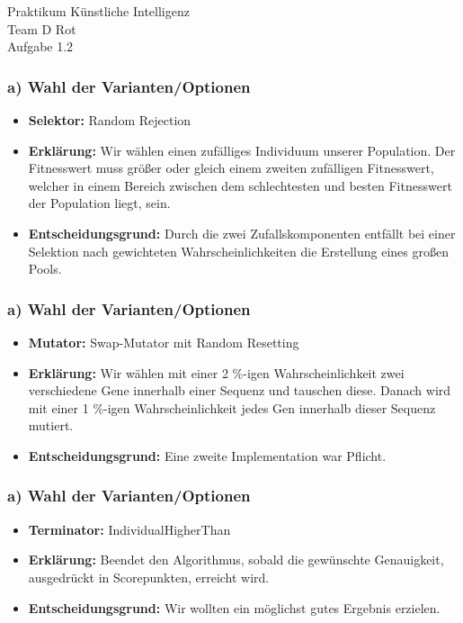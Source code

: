 \documentclass{beamer}
\begin{document}
\begin{frame}
  \begin{center}
    \Huge{Praktikum K\"unstliche Intelligenz} \\
    \vspace{1.5cm}
    \huge{Team D Rot} \\
    \vspace{1.5cm}
    \Large{Aufgabe 1.2}
  \end{center}
\end{frame}

\begin{frame}
  \frametitle{\textbf{a)} Wahl der Varianten/Optionen}
  \begin{itemize}
    \item \textbf{Selektor:} Random Rejection
    \item \textbf{Erklärung:} Wir wählen einen zufälliges Individuum unserer Population. Der Fitnesswert 		muss größer oder gleich  einem zweiten zufälligen Fitnesswert, welcher in einem Bereich zwischen dem 		schlechtesten und besten Fitnesswert der Population liegt, sein. 
   \item \textbf{Entscheidungsgrund:} Durch die zwei Zufallskomponenten entfällt bei einer Selektion 			nach gewichteten Wahrscheinlichkeiten die Erstellung eines großen Pools.
   
  \end{itemize}
\end{frame}

\begin{frame}
  \frametitle{\textbf{a)} Wahl der Varianten/Optionen}
  \begin{itemize}
    \item \textbf{Mutator:} Swap-Mutator mit Random Resetting
    \item \textbf{Erklärung:} Wir wählen mit einer 2 $\%$-igen Wahrscheinlichkeit zwei verschiedene Gene innerhalb einer Sequenz und tauschen diese. Danach wird mit einer 1 $\%$-igen Wahrscheinlichkeit jedes Gen innerhalb dieser Sequenz mutiert.
    \item \textbf{Entscheidungsgrund:} Eine zweite Implementation war Pflicht.
   
   
  \end{itemize}
\end{frame}



\begin{frame}
  \frametitle{\textbf{a)} Wahl der Varianten/Optionen}
  \begin{itemize}
    \item \textbf{Terminator:} IndividualHigherThan
    \item \textbf{Erklärung:} Beendet den Algorithmus, sobald die gewünschte Genauigkeit, ausgedrückt in Scorepunkten, erreicht wird.
    \item \textbf{Entscheidungsgrund:} Wir wollten ein möglichst gutes Ergebnis erzielen.
   
   
  \end{itemize}
\end{frame}
\end{document}
